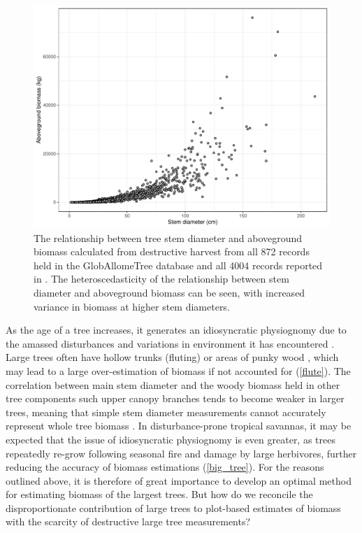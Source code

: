 \begin{refsection}
\begin{figure}[H]
\centering
	\includegraphics[width=\textwidth]{img/allometry}
	\caption{The relationship between tree stem diameter and aboveground biomass calculated from destructive harvest from all 872 records held in the GlobAllomeTree database \citep{Henry2013} and all 4004 records reported in \citet{Chave2014}. The heteroscedasticity of the relationship between stem diameter and aboveground biomass can be seen, with increased variance in biomass at higher stem diameters.}
	\label{allometry}
\end{figure}

As the age of a tree increases, it generates an idiosyncratic physiognomy due to the amassed disturbances and variations in environment it has encountered \citep{Lindenmayer2016}. Large trees often have hollow trunks (fluting) or areas of punky wood \citep{Chambers2001, Ruxton2014}, which may lead to a large over-estimation of biomass if not accounted for (\autoref{flute}). The correlation between main stem diameter and the woody biomass held in other tree components such upper canopy branches tends to become weaker in larger trees, meaning that simple stem diameter measurements cannot accurately represent whole tree biomass \citep{Goodman2014, Saglam2020}. In disturbance-prone tropical savannas, it may be expected that the issue of idiosyncratic physiognomy is even greater, as trees repeatedly re-grow following seasonal fire and damage by large herbivores, further reducing the accuracy of biomass estimations (\autoref{big_tree}). For the reasons outlined above, it is therefore of great importance to develop an optimal method for estimating biomass of the largest trees. But how do we reconcile the disproportionate contribution of large trees to plot-based estimates of biomass with the scarcity of destructive large tree measurements?


\end{refsection}
